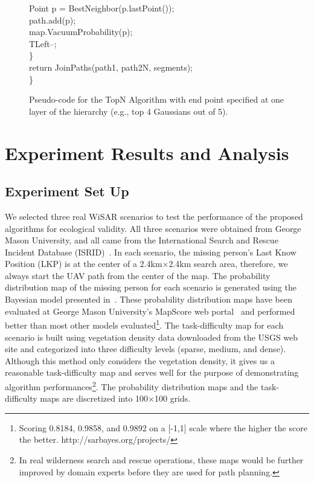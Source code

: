 \begin{figure}
{\begin{minipage}{\dimexpr\linewidth-2\fboxsep-2\fboxrule\relax}
\indent \indent Point p = BestNeighbor(p.lastPoint()); \\
\indent \indent path.add(p); \\
\indent \indent map.VacuumProbability(p); \\
\indent \indent TLeft--; \\
\indent \} \\
\indent return JoinPaths(path1, path2N, segments);\\
\}
\end{minipage}%
}
\caption[TopN algorithm pseudo-code]{Pseudo-code for the TopN Algorithm with end point specified at one layer of the hierarchy (e.g., top 4 Gaussians out of 5).}
\label{Code2}
\end{figure}

\section{Experiment Results and Analysis}
\label{sec:ExperimentResultsAndAnalysis}

\subsection{Experiment Set Up}

We selected three real WiSAR scenarios to test the performance of the proposed algorithms for ecological validity. All three scenarios were obtained from George Mason University, and all came from the International Search and Rescue Incident Database (ISRID)~\cite{Koester2008Lost}. In each scenario, the missing person's Last Know Position (LKP) is at the center of a 2.4km$\times$2.4km search area, therefore, we always start the UAV path from the center of the map. The probability distribution map of the missing person for each scenario is generated using the Bayesian model presented in~\cite{Lin2010Bayesian}. These probability distribution maps have been evaluated at George Mason University's MapScore web portal~\cite{Twardy2012MapScore} and performed better than most other models evaluated\footnote{Scoring 0.8184, 0.9858, and 0.9892 on a [-1,1] scale where the higher the score the better. http://sarbayes.org/projects/}. The task-difficulty map for each scenario is built using vegetation density data downloaded from the USGS web site and categorized into three difficulty levels (sparse, medium, and dense). Although this method only considers the vegetation density, it gives us a reasonable task-difficulty map and serves well for the purpose of demonstrating algorithm performances\footnote{In real wilderness search and rescue operations, these maps would be further improved by domain experts before they are used for path planning.}. The probability distribution maps and the task-difficulty maps are discretized into 100$\times$100 grids. 

